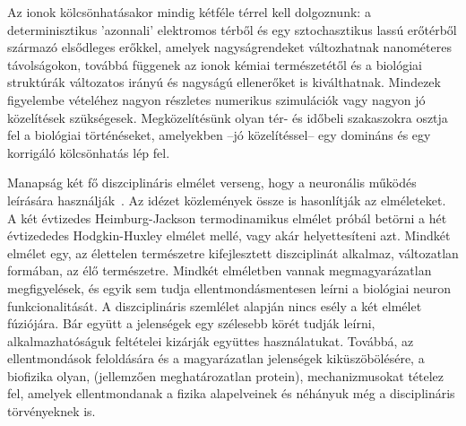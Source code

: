 \else

Az ionok kölcsönhatásakor mindig kétféle térrel kell dolgoznunk: a determinisztikus 'azonnali' elektromos térből
és egy sztochasztikus lassú erőtérből származó elsődleges erőkkel,
amelyek nagyságrendeket változhatnak
nanométeres távolságokon, továbbá függenek az ionok kémiai természetétől és a biológiai struktúrák változatos 
irányú és nagyságú ellenerőket is kiválthatnak. 
Mindezek figyelembe vételéhez nagyon részletes numerikus 
szimulációk vagy nagyon jó közelítések szükségesek.
Megközelítésünk olyan tér- és időbeli szakaszokra 
oszt\-ja fel a biológiai történéseket, amelyekben --jó közelítéssel-- egy domináns és egy korrigáló kölcsönhatás lép fel.

Manapság két fő diszciplináris elmélet verseng,
hogy a neuronális működés leírására használják~\cite{CriticalElectricity:2018,ThermodynamicAPDrukarch:2022, PerspectivesNerveSignalPropagation:2024, ComparisonHHandSoliton:2010, HH_Potential_Controversies_2017, PiezoelectricNeuron:2025}.
Az idézet közlemények össze is hasonlítják az elméleteket.
A két évtizedes Heimburg-Jackson termodinamikus elmélet
próbál betörni a hét évtizededes Hodgkin-Huxley elmélet mellé,
vagy akár helyettesíteni azt.
Mindkét elmélet egy, az élettelen természetre kifejlesztett diszciplinát alkalmaz, változatlan formában, az élő természetre. 
Mindkét elméletben vannak megmagyarázatlan megfigyelések,
és egyik sem tudja ellentmondásmentesen leírni a biológiai 
neuron funkcionalitását.
A diszciplináris szemlélet alapján nincs esély a két elmélet fúziójára.
Bár együtt a jelenségek egy szélesebb körét tudják leírni,
alkalmazhatóságuk feltételei kizárják együttes használatukat.
Továbbá, az ellentmondások feloldására és a magyarázatlan 
jelenségek kiküszöbölésére, a biofizika olyan,
(jellemzően meghatározatlan protein), mechanizmusokat 
tételez fel, amelyek ellentmondanak a fizika alapelveinek és
néhányuk még a disciplináris törvényeknek is.
\fi


